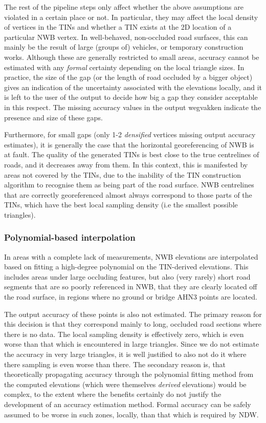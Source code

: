 The rest of the pipeline steps only affect whether the above assumptions are violated in a certain place or not. In particular, they may affect the local density of vertices in the TINs and whether a TIN exists at the 2D location of a particular NWB vertex. In well-behaved, non-occluded road surfaces, this can mainly be the result of large (groups of) vehicles, or temporary construction works. Although these are generally restricted to small areas, accuracy cannot be estimated with any \textit{formal} certainty depending on the local triangle sizes. In practice, the size of the gap (or the length of road occluded by a bigger object) gives an indication of the uncertainty associated with the elevations locally, and it is left to the user of the output to decide how big a gap they consider acceptable in this respect. The missing accuracy values in the output wegvakken indicate the presence and size of these gaps.

Furthermore, for small gaps (only 1-2 \textit{densified} vertices missing output accuracy estimates), it is generally the case that the horizontal georeferencing of NWB is at fault. The quality of the generated TINs is best close to the true centrelines of roads, and it decreases away from them. In this context, this is manifested by areas not covered by the TINs, due to the inability of the TIN construction algorithm to recognise them as being part of the road surface. NWB centrelines that are correctly georeferenced almost always correspond to those parts of the TINs, which have the best local sampling density (i.e the smallest possible triangles).

\subsubsection{Polynomial-based interpolation}

In areas with a complete lack of measurements, NWB elevations are interpolated based on fitting a high-degree polynomial on the TIN-derived elevations. This includes areas under large occluding features, but also (very rarely) short road segments that are so poorly referenced in NWB, that they are clearly located off the road surface, in regions where no ground or bridge AHN3 points are located.

The output accuracy of these points is also not estimated. The primary reason for this decision is that they correspond mainly to long, occluded road sections where there is no data. The local sampling density is effectively zero, which is even worse than that which is encountered in large triangles. Since we do not estimate the accuracy in very large triangles, it is well justified to also not do it where there sampling is even worse than there. The secondary reason is, that theoretically propagating accuracy through the polynomial fitting method from the computed elevations (which were themselves \textit{derived} elevations) would be complex, to the extent where the benefits certainly do not justify the development of an accuracy estimation method. Formal accuracy can be safely assumed to be worse in such zones, locally, than that which is required by NDW.

